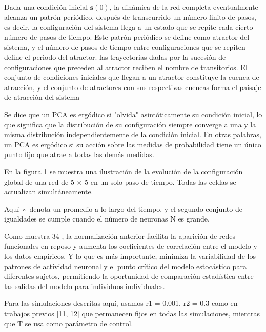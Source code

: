Dada una condición inicial $\mathbf{s}(0)$, la dinámica de la red completa eventualmente alcanza un patrón periódico, después de transcurrido un número finito de pasos, es decir, la configuración del sistema llega a un estado que se repite cada cierto número de pasos de tiempo. Este patrón periódico se define como atractor del sistema, y el número de pasos de tiempo entre configuraciones que se repiten define el periodo del atractor. las trayectorias dadas por  la sucesión de configuraciones que preceden al atractor reciben el nombre de transitorios. El conjunto de condiciones iniciales que llegan a un atractor constituye la cuenca de atracción, y el conjunto de atractores con sus respectivas cuencas forma el paisaje de atracción del sistema




Se dice que un PCA es ergódico si "olvida" asintóticamente su condición inicial, lo que significa que la distribución de su configuración siempre converge a una y la misma distribución independientemente de la condición inicial. En otras palabras, un PCA es ergódico si su acción sobre las medidas de probabilidad tiene un único punto fijo que atrae a todas las demás medidas.

En la figura 1 se muestra una ilustración de la evolución de la configuración global de una red de 5 × 5 en un solo paso de tiempo. Todas las celdas se actualizan simultáneamente.


Aquí ◦ denota un promedio a lo largo del tiempo, y el segundo conjunto de igualdades se cumple cuando el número de neuronas N es grande.





Como muestra 34 , la normalización anterior facilita la aparición de redes funcionales en reposo y aumenta los coeficientes de correlación entre el modelo y los datos empíricos. Y lo que es más importante, minimiza la variabilidad de los patrones de actividad neuronal y el punto crítico del modelo estocástico para diferentes sujetos, permitiendo la oportunidad de comparación estadística entre las salidas del modelo para individuos individuales.



Para las simulaciones descritas aquí, usamos r1 = 0.001, r2 = 0.3 como en trabajos previos [11, 12] que permanecen fijos en todas las simulaciones, mientras que T se usa como parámetro de control.


